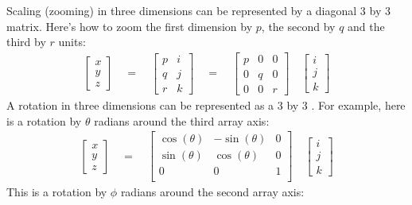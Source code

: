 \documentclass[letterpaper,10pt,english]{sphinxmanual}
\begin{document}
Scaling (zooming) in three dimensions can be represented by a diagonal 3 by 3
matrix.  Here’s how to zoom the first dimension by \(p\), the second by \(q\) and
the third by \(r\) units:
\begin{equation*}
\begin{split}
\begin{bmatrix}
x\\
y\\
z
\end{bmatrix} 
\quad
=
\quad
\begin{bmatrix}
p & i\\
q & j\\
r & k
\end{bmatrix}
\quad
=
\quad
\begin{bmatrix}
p & 0 & 0 \\
0 & q & 0 \\
0 & 0 & r
\end{bmatrix}
\quad
\begin{bmatrix}
i\\
j\\
k
\end{bmatrix}
\end{split}
\end{equation*}
A rotation in three dimensions can be represented as a 3 by 3  . For example, here is a rotation by \(\theta\) radians around the third array axis:
\begin{equation*}
\begin{split}
\begin{bmatrix}
x \\
y \\
z
\end{bmatrix}
\quad
=
\quad
\begin{bmatrix}
\cos(\theta) &  -\sin(\theta) & 0 \\
\sin(\theta) & \cos(\theta) & 0 \\
0 & 0 & 1 \\
\end{bmatrix}
\quad
\begin{bmatrix}
i \\
j \\
k
\end{bmatrix}
\end{split}
\end{equation*}
This is a rotation by \(\phi\) radians around the second array axis:
\end{document}
